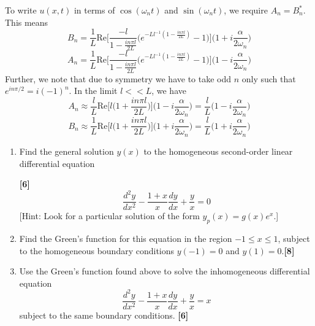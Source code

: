 \documentclass[a4paper]{article}
\begin{document}
\begin{ans}
\begin{enumerate}[label=(\roman*)]
To write $u(x,t)$ in terms of $\cos(\omega_nt)$ and $\sin(\omega_nt)$, we require $A_n=B_n^*$. This means $$B_n=\frac{1}{L}\text{Re}\bigg[\frac{-l}{1-\frac{in\pi l}{2L}}\bigg(e^{-Ll^{-1}(1-\frac{in\pi l}{2L})}-1\bigg)\bigg]\bigg(1+i\frac{\alpha}{2\omega_n}\bigg)$$
$$A_n=\frac{1}{L}\text{Re}\bigg[\frac{-l}{1-\frac{in\pi l}{2L}}\bigg(e^{-Ll^{-1}(1-\frac{in\pi l}{2L})}-1\bigg)\bigg]\bigg(1-i\frac{\alpha}{2\omega_n}\bigg)$$
Further, we note that due to symmetry we have to take odd $n$ only such that $e^{in\pi/2}=i(-1)^n$. In the limit $l<<L$, we have
$$A_n\approx\frac{l}{L}\text{Re}\bigg[l\bigg(1+\frac{in\pi l}{2L}\bigg)\bigg]\bigg(1-i\frac{\alpha}{2\omega_n}\bigg)=\frac{l}{L}\bigg(1-i\frac{\alpha}{2\omega_n}\bigg)$$
$$B_n\approx\frac{1}{L}\text{Re}\bigg[l\bigg(1+\frac{in\pi l}{2L}\bigg)\bigg]\bigg(1+i\frac{\alpha}{2\omega_n}\bigg)=\frac{l}{L}\bigg(1+i\frac{\alpha}{2\omega_n}\bigg)$$
\end{enumerate}
\end{ans}
\newpage
\begin{qns}\leavevmode
\begin{enumerate}[label=(\roman*)]
\item Find the general solution $y(x)$ to the homogeneous second-order linear differential equation

\hfill \textbf{[6]}
$$\frac{d^2y}{dx^2}-\frac{1+x}{x}\frac{dy}{dx}+\frac{y}{x}=0$$
[Hint: Look for a particular solution of the form $y_p(x)=g(x)e^x$.]
\item Find the Green's function for this equation in the region $-1\leq x\leq 1$, subject to the homogeneous boundary conditions $y(-1)=0$ and $y(1)=0$.\hfill \textbf{[8]}
\item Use the Green's function found above to solve the inhomogeneous differential equation
$$\frac{d^2y}{dx^2}-\frac{1+x}{x}\frac{dy}{dx}+\frac{y}{x}=x$$
subject to the same boundary conditions. \hfill \textbf{[6]}
\end{enumerate}
\end{qns}
\end{document}
